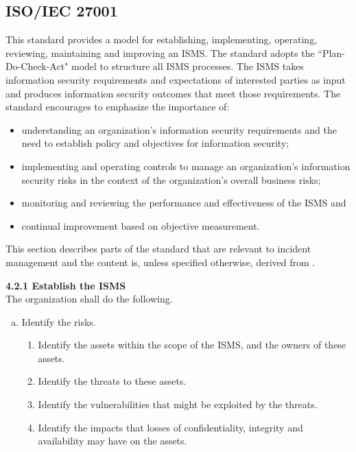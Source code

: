 \subsection{\acs{ISO}/\acs{IEC} 27001}
\label{sec:iso27001}
This standard provides a model for establishing, implementing, operating, reviewing, maintaining and improving an \ac{ISMS}. The standard adopts the ``Plan-Do-Check-Act" model to structure all \ac{ISMS} processes. The \ac{ISMS} takes information security requirements and expectations of interested parties as input and produces information security outcomes that meet those requirements. The standard encourages to emphasize the importance of:

\begin{itemize}\itemsep-0.2cm
\item understanding an organization's information security requirements and the need to establish policy and objectives for information security;
\item implementing and operating controls to manage an organization's information security risks in the context of the organization's overall business risks;
\item monitoring and reviewing the performance and effectiveness of the \ac{ISMS} and
\item continual improvement based on objective measurement.
\end{itemize}

This section describes parts of the standard that are relevant to incident management and the content is, unless specified otherwise, derived from \cite{ISO/IEC27001}.

\textbf{4.2.1 Establish the \ac{ISMS} } \\
The organization shall do the following.
\begin{enumerate}[d)]
\item Identify the risks.
\begin{enumerate}[1)]\itemsep-0.2cm
\item Identify the assets within the scope of the \ac{ISMS}, and the owners of these assets.
\item Identify the threats to these assets.
\item Identify the vulnerabilities that might be exploited by the threats.
\item Identify the impacts that losses of confidentiality, integrity and availability may have on the assets.
\end{enumerate}
\end{enumerate}

